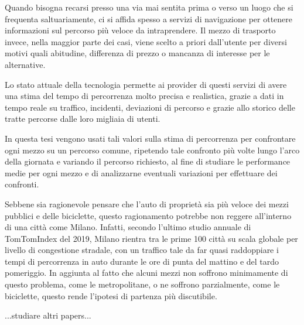 Quando bisogna recarsi presso una via mai sentita prima o verso un luogo che si frequenta saltuariamente, ci si affida spesso a servizi di navigazione per ottenere informazioni sul percorso più veloce da intraprendere.
Il mezzo di trasporto invece, nella maggior parte dei casi, viene scelto a priori dall'utente per diversi motivi quali abitudine, differenza di prezzo o mancanza di interesse per le alternative.

Lo stato attuale della tecnologia permette ai provider di questi servizi di avere una stima del tempo di percorrenza molto precisa e realistica, grazie a dati in tempo reale su traffico, incidenti, deviazioni di percorso e grazie allo storico delle tratte percorse dalle loro migliaia di utenti.

In questa tesi vengono usati tali valori sulla stima di percorrenza per confrontare ogni mezzo su un percorso comune, ripetendo tale confronto più volte lungo l'arco della giornata e variando il percorso richiesto, al fine di studiare le performance medie per ogni mezzo e di analizzarne eventuali variazioni per effettuare dei confronti.

Sebbene sia ragionevole pensare che l'auto di proprietà sia più veloce dei mezzi pubblici e delle biciclette, questo ragionamento potrebbe non reggere all'interno di una città come Milano. Infatti, secondo l'ultimo studio annuale di TomTomIndex del 2019\cite{tomtomindexmilan}, Milano rientra tra le prime 100 città su scala globale per livello di congestione stradale, con un traffico tale da far quasi raddoppiare i tempi di percorrenza in auto durante le ore di punta del mattino e del tardo pomeriggio. In aggiunta al fatto che alcuni mezzi non soffrono minimamente di questo problema, come le metropolitane, o ne soffrono parzialmente, come le biciclette, questo rende l'ipotesi di partenza più discutibile.

...studiare altri papers...
